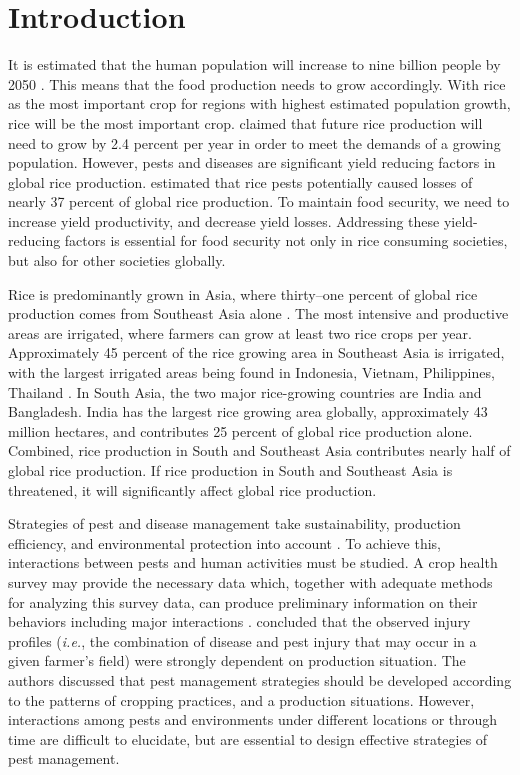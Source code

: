 \chapter{Introduction}
It is estimated that the human population will increase to nine billion people by 2050 \citep{Worldbank_2008}. This means that the food production needs to grow accordingly. With rice as the most important crop for regions with highest estimated population growth, rice will be the most important crop. \citet{Ray_2013_Yield} claimed that future rice production will need to grow by 2.4 percent per year in order to meet the demands of a growing population. However, pests and diseases are significant yield reducing factors in global rice production. \citet{Oerke_2005_Crop} estimated that rice pests potentially caused losses of nearly 37 percent of global rice production. To maintain food security, we need to increase yield productivity, and decrease yield losses. Addressing these yield-reducing factors is essential for food security not only in rice consuming societies, but also for other societies globally. 


Rice is predominantly grown in Asia, where thirty–one percent of global rice production comes from Southeast Asia alone \citep{OECD_2012_Agricultural}. The most intensive and productive areas are irrigated, where farmers can grow at least two rice crops per year. Approximately 45 percent of the rice growing area in Southeast Asia is irrigated, with the largest irrigated areas being found in Indonesia, Vietnam, Philippines, Thailand \citep{Mutert_2002_Developments}. In South Asia, the two major rice-growing countries are India and Bangladesh. India has the largest rice growing area globally, approximately 43 million hectares, and contributes 25 percent of global rice production alone. Combined, rice production in South and Southeast Asia contributes nearly half of global rice production. If rice production in South and Southeast Asia is threatened, it will significantly affect global rice production. 

Strategies of pest and disease management take sustainability, production efficiency, and environmental protection into account \citep{Mew_2004_Looking}. To achieve this, interactions between pests and human activities must be studied. A crop health survey may provide the necessary data which, together with adequate methods for analyzing this survey data, can produce preliminary information on their behaviors including major interactions \citep{Savary_1995_Use}. \citet{Savary_2000_Characterization} concluded that the observed injury profiles (\textit{i.e.}, the combination of disease and pest injury that may occur in a given farmer’s field) were strongly dependent on production situation. The authors discussed that pest management strategies should be developed according to the patterns of cropping practices, and a production situations. However, interactions among pests and environments under different locations or through time are difficult to elucidate, but are essential to design effective  strategies of pest management. 

